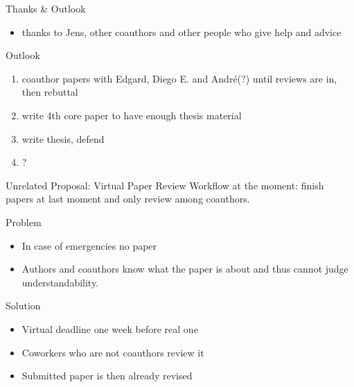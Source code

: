 \documentclass[14pt,aspectratio=1610]{beamer}
\begin{document}
\begin{frame}{Thanks \& Outlook}
\begin{itemize}
\item thanks to Jens, other coauthors and other people who give help and advice
\end{itemize}
\begin{block}{Outlook}
\begin{enumerate}
\item coauthor papers with Edgard, Diego E. and André(?) until reviews are in, then rebuttal
\item write 4th core paper to have enough thesis material
\item write thesis, defend
\item ?
\end{enumerate}
\end{block}
\end{frame}

\begin{frame}{Unrelated Proposal: Virtual Paper Review}
Workflow at the moment: finish papers at last moment and only review among coauthors.
{
\begin{block}{Problem}
\begin{itemize}
\item In case of emergencies no paper 
\item Authors and coauthors know what the paper is about and thus cannot judge understandability.
\end{itemize}
\end{block}
}
{
\begin{block}{Solution}
\begin{itemize}
\item Virtual deadline one week before real one
\item Coworkers who are not coauthors review it
\item Submitted paper is then already revised 
\end{itemize}
\end{block}
}
\end{frame}
\end{document}
